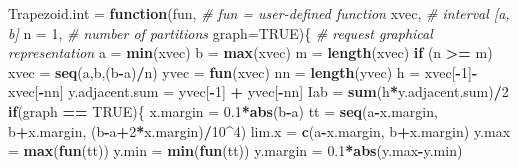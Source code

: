 \documentclass[
]{book}
\newenvironment{Shaded}{\begin{snugshade}}{\end{snugshade}}
\newcommand{\AttributeTok}[1]{\textcolor[rgb]{0.13,0.29,0.53}{#1}}
\newcommand{\CommentTok}[1]{\textcolor[rgb]{0.56,0.35,0.01}{\textit{#1}}}
\newcommand{\ConstantTok}[1]{\textcolor[rgb]{0.56,0.35,0.01}{#1}}
\newcommand{\ControlFlowTok}[1]{\textcolor[rgb]{0.13,0.29,0.53}{\textbf{#1}}}
\newcommand{\DecValTok}[1]{\textcolor[rgb]{0.00,0.00,0.81}{#1}}
\newcommand{\FloatTok}[1]{\textcolor[rgb]{0.00,0.00,0.81}{#1}}
\newcommand{\FunctionTok}[1]{\textcolor[rgb]{0.13,0.29,0.53}{\textbf{#1}}}
\newcommand{\NormalTok}[1]{#1}
\newcommand{\OtherTok}[1]{\textcolor[rgb]{0.56,0.35,0.01}{#1}}
\newcommand{\SpecialCharTok}[1]{\textcolor[rgb]{0.81,0.36,0.00}{\textbf{#1}}}
\begin{document}
\begin{Shaded}
\begin{Highlighting}[]
\NormalTok{Trapezoid.int }\OtherTok{=} \ControlFlowTok{function}\NormalTok{(fun,          }\CommentTok{\# fun = user{-}defined function}
\NormalTok{                         xvec,         }\CommentTok{\# interval [a, b] }
                         \AttributeTok{n =} \DecValTok{1}\NormalTok{,        }\CommentTok{\# number of partitions}
                         \AttributeTok{graph=}\ConstantTok{TRUE}\NormalTok{)\{  }\CommentTok{\# request graphical representation}
\NormalTok{  a }\OtherTok{=} \FunctionTok{min}\NormalTok{(xvec)}
\NormalTok{  b }\OtherTok{=} \FunctionTok{max}\NormalTok{(xvec)}
\NormalTok{  m }\OtherTok{=} \FunctionTok{length}\NormalTok{(xvec)}
  \ControlFlowTok{if}\NormalTok{ (n }\SpecialCharTok{\textgreater{}=}\NormalTok{ m) xvec }\OtherTok{=} \FunctionTok{seq}\NormalTok{(a,b,(b}\SpecialCharTok{{-}}\NormalTok{a)}\SpecialCharTok{/}\NormalTok{n)}
\NormalTok{  yvec }\OtherTok{=} \FunctionTok{fun}\NormalTok{(xvec)}
\NormalTok{  nn }\OtherTok{=} \FunctionTok{length}\NormalTok{(yvec)}
\NormalTok{  h }\OtherTok{=}\NormalTok{ xvec[}\SpecialCharTok{{-}}\DecValTok{1}\NormalTok{]}\SpecialCharTok{{-}}\NormalTok{ xvec[}\SpecialCharTok{{-}}\NormalTok{nn]}
\NormalTok{  y.adjacent.sum }\OtherTok{=}\NormalTok{  yvec[}\SpecialCharTok{{-}}\DecValTok{1}\NormalTok{] }\SpecialCharTok{+}\NormalTok{ yvec[}\SpecialCharTok{{-}}\NormalTok{nn]}
\NormalTok{  Iab }\OtherTok{=} \FunctionTok{sum}\NormalTok{(h}\SpecialCharTok{*}\NormalTok{y.adjacent.sum)}\SpecialCharTok{/}\DecValTok{2}
  \ControlFlowTok{if}\NormalTok{(graph }\SpecialCharTok{==} \ConstantTok{TRUE}\NormalTok{)\{}
\NormalTok{      x.margin }\OtherTok{=} \FloatTok{0.1}\SpecialCharTok{*}\FunctionTok{abs}\NormalTok{(b}\SpecialCharTok{{-}}\NormalTok{a)}
\NormalTok{      tt }\OtherTok{=} \FunctionTok{seq}\NormalTok{(a}\SpecialCharTok{{-}}\NormalTok{x.margin, b}\SpecialCharTok{+}\NormalTok{x.margin, (b}\SpecialCharTok{{-}}\NormalTok{a}\SpecialCharTok{+}\DecValTok{2}\SpecialCharTok{*}\NormalTok{x.margin)}\SpecialCharTok{/}\DecValTok{10}\SpecialCharTok{\^{}}\DecValTok{4}\NormalTok{)}
\NormalTok{      lim.x }\OtherTok{=} \FunctionTok{c}\NormalTok{(a}\SpecialCharTok{{-}}\NormalTok{x.margin, b}\SpecialCharTok{+}\NormalTok{x.margin)}
\NormalTok{      y.max }\OtherTok{=} \FunctionTok{max}\NormalTok{(}\FunctionTok{fun}\NormalTok{(tt))}
\NormalTok{      y.min }\OtherTok{=} \FunctionTok{min}\NormalTok{(}\FunctionTok{fun}\NormalTok{(tt))}
\NormalTok{      y.margin }\OtherTok{=} \FloatTok{0.1}\SpecialCharTok{*}\FunctionTok{abs}\NormalTok{(y.max}\SpecialCharTok{{-}}\NormalTok{y.min)}

\end{Highlighting}
\end{Shaded}
\end{document}
